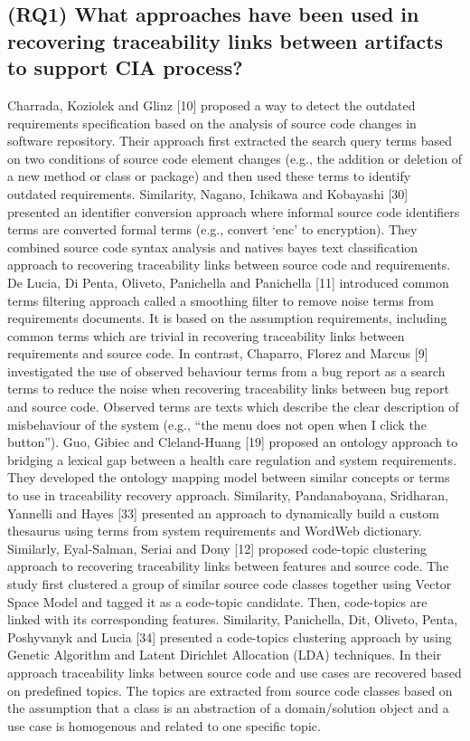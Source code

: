 \documentclass[conference]{IEEEtran}
\begin{document}
\subsection{(RQ1) 
What approaches have been used in recovering traceability links between artifacts to support CIA process?}
Charrada, Koziolek and Glinz [10] proposed a way to detect the outdated requirements specification based on the analysis of source code changes in software repository. Their approach first extracted the search query terms based on two conditions of source code element changes (e.g., the addition or deletion of a new method or class or package) and then used these terms to identify outdated requirements. Similarity, Nagano, Ichikawa and Kobayashi [30] presented an identifier conversion  approach  where informal source code identifiers terms are converted formal terms (e.g., convert ‘enc’  to encryption). They combined source code syntax analysis and natives bayes text classification approach to recovering traceability links between source code and requirements. \newline
De Lucia, Di Penta, Oliveto, Panichella and Panichella [11] introduced common terms filtering approach called a smoothing filter to remove noise terms from requirements documents.  It is based on the assumption requirements, including common terms which are trivial in recovering traceability links between requirements and source code. In contrast, Chaparro, Florez and Marcus [9] investigated the use of observed behaviour terms from a bug report as a search terms to reduce the noise when recovering traceability links between bug report and source code. Observed terms are texts which describe the clear description of misbehaviour of the system (e.g., “the menu does not open when I click the button”).
Guo, Gibiec and Cleland-Huang [19] proposed an ontology approach to bridging a lexical gap between a health care regulation and system requirements. They developed the ontology mapping model between similar concepts or terms to use in traceability recovery approach. Similarity, Pandanaboyana, Sridharan, Yannelli and Hayes [33] presented an approach to dynamically build a custom thesaurus using terms from system requirements and WordWeb dictionary.\newline
Similarly, Eyal-Salman, Seriai and Dony [12] proposed code-topic clustering approach to recovering traceability links between features and source code. The study first clustered a group of similar source code classes together using Vector Space Model and tagged it as a code-topic candidate. Then, code-topics are linked with its corresponding features. Similarity,  Panichella, Dit, Oliveto, Penta, Poshyvanyk and Lucia [34] presented a code-topics clustering approach by using Genetic Algorithm and Latent Dirichlet Allocation (LDA) techniques. 
In their approach traceability links between source code and use cases are recovered based on predefined topics.  The topics are extracted from source code classes based on the assumption that a class is an abstraction of a domain/solution object and a use case is homogenous and related to one specific topic.
\end{document}
